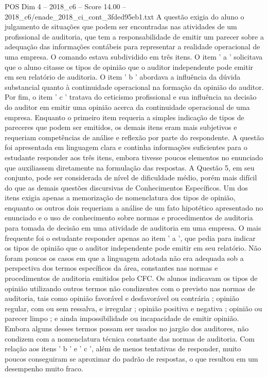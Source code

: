 \begin{textsample}{POS Dim 4 – 2018\_c6 – Score 14.00 – 2018\_c6/enade\_2018\_ci\_cont\_3fded95eb1.txt}
A questão exigia do aluno o julgamento de situações que podem ser encontradas nas atividades de um profissional de auditoria, que tem a responsabilidade de emitir um parecer sobre a adequação das informações contábeis para representar a realidade operacional de uma empresa.
O comando estava subdividido em três itens.
O item ' a ' solicitava que o aluno citasse os tipos de opinião que o auditor independente pode emitir em seu relatório de auditoria.
O item ' b ' abordava a influência da dúvida substancial quanto à continuidade operacional na formação da opinião do auditor.
Por fim, o item ' c ' tratava do ceticismo profissional e sua influência na decisão do auditor em emitir uma opinião acerca da continuidade operacional de uma empresa.
Enquanto o primeiro item requeria a simples indicação de tipos de pareceres que podem ser emitidos, os demais itens eram mais subjetivos e requeriam competências de análise e reflexão por parte do respondente.
A questão foi apresentada em linguagem clara e continha informações suficientes para o estudante responder aos três itens, embora tivesse poucos elementos no enunciado que auxiliassem diretamente na formulação das respostas.
A Questão 5, em seu conjunto, pode ser considerada de nível de dificuldade médio, porém mais difícil do que as demais questões discursivas de Conhecimentos Específicos.
Um dos itens exigia apenas a memorização de nomenclatura dos tipos de opinião, enquanto os outros dois requeriam a análise de um fato hipotético apresentado no enunciado e o uso de conhecimento sobre normas e procedimentos de auditoria para tomada de decisão em uma atividade de auditoria em uma empresa.
O mais frequente foi o estudante responder apenas ao item ' a ', que pedia para indicar os tipos de opinião que o auditor independente pode emitir em seu relatório.
Não foram poucos os casos em que a linguagem adotada não era adequada sob a perspectiva dos termos específicos da área, constantes nas normas e procedimentos de auditoria emitidos pelo CFC.
Os alunos indicavam os tipos de opinião utilizando outros termos não condizentes com o previsto nas normas de auditoria, tais como opinião favorável e desfavorável ou contrária ; opinião regular, com ou sem ressalva, e irregular ; opinião positiva e negativa ; opinião ou parecer limpo ; e ainda impossibilidade ou incapacidade de emitir opinião.
Embora alguns desses termos possam ser usados no jargão dos auditores, não condizem com a nomenclatura técnica constante das normas de auditoria.
Com relação aos itens ' b ' e ' c ', além de menos tentativas de responder, muito poucos conseguiram se aproximar do padrão de respostas, o que resultou em um desempenho muito fraco.

\end{textsample}
